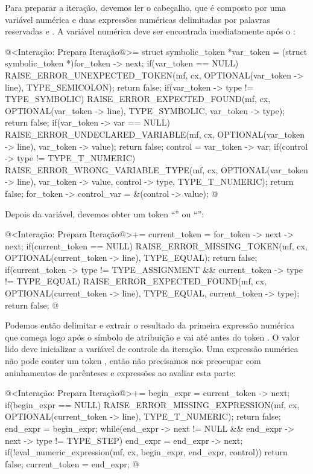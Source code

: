 {{{{{{Para preparar a iteração, devemos ler o cabeçalho, que é composto por
uma variável numérica e duas expressões numéricas delimitadas por
palavras reservadas  e . A variável
numérica deve ser encontrada imediatamente após o :

\iniciocodigo
@<Interação: Prepara Iteração@>=
{
  struct symbolic_token *var_token = (struct symbolic_token *)for_token -> next;
  if(var_token == NULL){
    RAISE_ERROR_UNEXPECTED_TOKEN(mf, cx, OPTIONAL(var_token -> line),
                                TYPE_SEMICOLON);
    return false;
  }
  if(var_token -> type != TYPE_SYMBOLIC){
    RAISE_ERROR_EXPECTED_FOUND(mf, cx, OPTIONAL(var_token -> line),
                              TYPE_SYMBOLIC, var_token -> type);
    return false;
  }
  if(var_token -> var == NULL){
    RAISE_ERROR_UNDECLARED_VARIABLE(mf, cx, OPTIONAL(var_token -> line),
                                   var_token -> value);
    return false;
  }
  control = var_token -> var;
  if(control -> type != TYPE_T_NUMERIC){
    RAISE_ERROR_WRONG_VARIABLE_TYPE(mf, cx, OPTIONAL(var_token -> line),
                                   var_token -> value, control -> type,
                                   TYPE_T_NUMERIC);
    return false;
  }
  for_token -> control_var = &(control -> value);
}
@
\fimcodigo

Depois da variável, devemos obter um token ``\monoespaco{=}'' ou
``\monoespaco{:=}'':

\iniciocodigo
@<Interação: Prepara Iteração@>+=
{
  current_token = for_token -> next -> next;
  if(current_token == NULL){
    RAISE_ERROR_MISSING_TOKEN(mf, cx, OPTIONAL(current_token -> line),
                             TYPE_EQUAL);
    return false;
  }
  if(current_token -> type != TYPE_ASSIGNMENT &&
     current_token -> type != TYPE_EQUAL){
    RAISE_ERROR_EXPECTED_FOUND(mf, cx, OPTIONAL(current_token -> line),
                              TYPE_EQUAL, current_token -> type);
    return false;
  }
}
@
\fimcodigo

Podemos então delimitar e extrair o resultado da primeira expressão
numérica que começa logo após o símbolo de atribuição e vai até antes
do token . O valor lido deve inicializar a variável
de controle da iteração. Uma expressão numérica não pode conter um
token , então não precisamos nos preocupar com
aninhamentos de parênteses e expressões ao avaliar esta parte:

\iniciocodigo
@<Interação: Prepara Iteração@>+=
{
  begin_expr = current_token -> next;
  if(begin_expr == NULL){
    RAISE_ERROR_MISSING_EXPRESSION(mf, cx, OPTIONAL(current_token -> line),
                                   TYPE_T_NUMERIC);
    return false;
  }
  end_expr = begin_expr;
  while(end_expr -> next != NULL && end_expr -> next -> type != TYPE_STEP)
    end_expr = end_expr -> next;
  if(!eval_numeric_expression(mf, cx, begin_expr, end_expr, control))
    return false;
  current_token = end_expr;
}
@
\fimcodigo

}}}}}}
